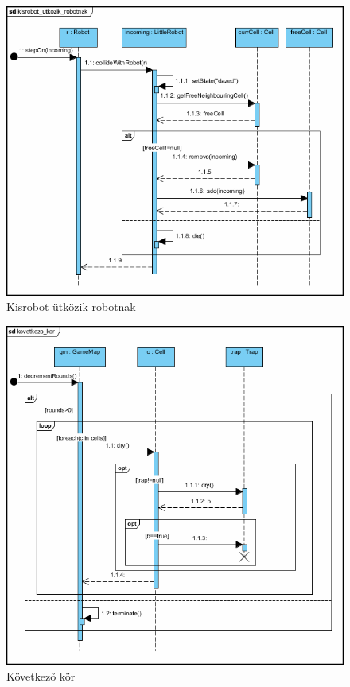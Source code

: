 \begin{figure}[h]
	\begin{center}
		\includegraphics[width=17cm]{chapters/chapter01/kisrobot_utkozik_robotnak.png}
		\caption{Kisrobot ütközik robotnak}
		\label{fig:SzkeletonUseCase}
	\end{center}
\end{figure}
\clearpage

\begin{figure}[h]
	\begin{center}
		\includegraphics[width=17cm]{chapters/chapter01/kovetkezo_kor.png}
		\caption{Következő kör}
		\label{fig:SzkeletonUseCase}
	\end{center}
\end{figure}
\clearpage


